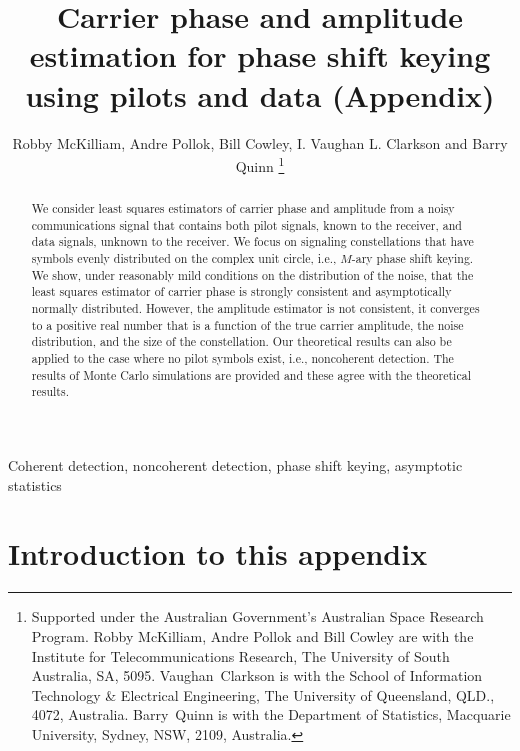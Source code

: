 \documentclass[journal]{IEEEtran}
\title{Carrier phase and amplitude estimation for phase shift keying using pilots and data (Appendix)}
\author{Robby McKilliam, Andre Pollok, Bill Cowley, I. Vaughan L. Clarkson and Barry Quinn
\thanks{
Supported under the Australian Government’s Australian Space Research Program.
Robby McKilliam, Andre Pollok and Bill Cowley are with the Institute for Telecommunications Research, The University of South Australia, SA, 5095.  Vaughan~Clarkson is with the School of Information Technology \& Electrical Engineering, The University of Queensland, QLD., 4072, Australia.  Barry~Quinn is with the Department of Statistics, Macquarie University, Sydney, NSW, 2109, Australia.
}}
\begin{document}
\maketitle

\begin{abstract}
We consider least squares estimators of carrier phase and amplitude from a noisy communications signal that contains both pilot signals, known to the receiver, and data signals, unknown to the receiver.  We focus on signaling constellations that have symbols evenly distributed on the complex unit circle, i.e., $M$-ary phase shift keying.  We show, under reasonably mild conditions on the distribution of the noise, that the least squares estimator of carrier phase is strongly consistent and asymptotically normally distributed.  However, the amplitude estimator is not consistent, it converges to a positive real number that is a function of the true carrier amplitude, the noise distribution, and the size of the constellation.  Our theoretical results can also be applied to the case where no pilot symbols exist, i.e., noncoherent detection.  The results of Monte Carlo simulations are provided and these agree with the theoretical results.   
\end{abstract}
\begin{IEEEkeywords}
Coherent detection, noncoherent detection, phase shift keying, asymptotic statistics
\end{IEEEkeywords}

\setcounter{equation}{20}
\setcounter{lasteqplusone}{\value{equation}}
\addtocounter{lasteqplusone}{1}
\setcounter{section}{9}
\setcounter{lastsecplusone}{\value{section}}
\addtocounter{lastsecplusone}{1}


\section{Introduction to this appendix}
\end{document}

